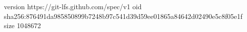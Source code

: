 version https://git-lfs.github.com/spec/v1
oid sha256:876491da985850899b7248b97c541d39d59ee01865a84642d02490e5c8f05e1f
size 1048672
